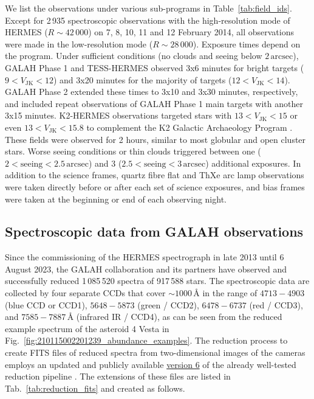 \documentclass[
  journal=pasa,
  manuscript=research-paper, %
  year=2023,
  volume=37
]{cup-journal}
\newcommand{\allstarnumber}{917\,588\xspace}
\newcommand{\allspecnumber}{1\,085\,520\xspace}
\begin{document}
We list the observations under various sub-programs in Table~\ref{tab:field_ids}. Except for 2\,935 spectroscopic observations with the high-resolution mode of HERMES ($R \sim 42\,000$) on 7, 8, 10, 11 and 12 February 2014, all observations were made in the low-resolution mode ($R \sim 28\,000$). Exposure times depend on the program. Under sufficient conditions (no clouds and seeing below $2\,\mathrm{arcsec}$), GALAH Phase 1 and TESS-HERMES observed 3x6 minutes for bright targets ($9 < V_\mathrm{JK} < 12$) and 3x20 minutes for the majority of targets ($12 < V_\mathrm{JK} < 14$). GALAH Phase 2 extended these times to 3x10 and 3x30 minutes, respectively, and included repeat observations of GALAH Phase 1 main targets with another 3x15 minutes. K2-HERMES observations targeted stars with $13 < V_\mathrm{JK} < 15$ or even $13 < V_\mathrm{JK} < 15.8$ to complement the K2 Galactic Archaeology Program \citep{Stello2015}. These fields were observed for 2 hours, similar to most globular and open cluster stars. Worse seeing conditions or thin clouds triggered between one ($2 < \mathrm{seeing} < 2.5\,\mathrm{arcsec}$) and 3 ($2.5 < \mathrm{seeing} < 3\,\mathrm{arcsec}$) additional exposures. In addition to the science frames, quartz fibre flat and ThXe arc lamp observations were taken directly before or after each set of science exposures, and bias frames were taken at the beginning or end of each observing night.

\subsection{Spectroscopic data from GALAH observations}
\label{sec:spectroscopic_data_from_galah_observations}

Since the commissioning of the HERMES spectrograph in late 2013 until 6 August 2023, the GALAH collaboration and its partners have observed and successfully reduced \allspecnumber spectra of \allstarnumber stars. The spectroscopic data are collected by four separate CCDs that cover $\sim 1000\,\text{\AA}$ in the range of $4713-4903$ (blue CCD or CCD1), $5648-5873$ (green / CCD2), $6478-6737$ (red / CCD3), and $7585-7887\,\text{\AA}$ (infrared IR / CCD4), as can be seen from the reduced example spectrum of the asteroid 4 Vesta in Fig.~\ref{fig:210115002201239_abundance_examples}. The reduction process to create FITS files of reduced spectra from two-dimensional images of the cameras employs an updated and publicly available \href{https://github.com/sheliak/galah_reduction/blob/master/extract6.0.py}{version 6} of the already well-tested reduction pipeline \citep{Kos2017}. The extensions of these files are listed in Tab.~\ref{tab:reduction_fits} and created as follows.
\end{document}
